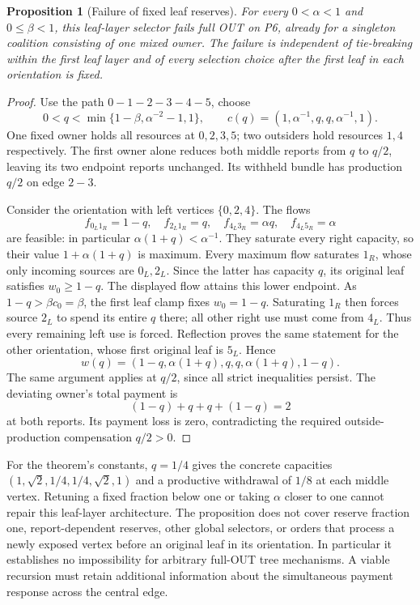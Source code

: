 \documentclass[11pt]{article}
\newtheorem{proposition}[theorem]{Proposition}
\theoremstyle{definition}\newtheorem{definition}[theorem]{Definition}
\theoremstyle{remark}\newtheorem{remark}[theorem]{Remark}
\begin{document}
\begin{proposition}[Failure of fixed leaf reserves]\label{graph:recursion-failure}
For every $0<\alpha<1$ and $0\le\beta<1$, this leaf-layer selector fails
full OUT on P6, already for a singleton coalition consisting of one mixed owner.
The failure is independent of tie-breaking within the first leaf layer and
of every selection choice after the first leaf in each orientation is fixed.
\end{proposition}
\begin{proof}
Use the path $0-1-2-3-4-5$, choose
\[
 0<q<\min\{1-\beta,\alpha^{-2}-1,1\},
 \qquad c(q)=(1,\alpha^{-1},q,q,\alpha^{-1},1).
\]
One fixed owner holds all resources at $0,2,3,5$; two outsiders hold resources
$1,4$ respectively. The first owner alone reduces both middle reports from
$q$ to $q/2$, leaving its two endpoint reports unchanged. Its withheld bundle
has production $q/2$ on edge $2-3$.

Consider the orientation with left vertices $\{0,2,4\}$. The flows
\[
 f_{0_L1_R}=1-q,\quad f_{2_L1_R}=q,\quad
 f_{4_L3_R}=\alpha q,\quad f_{4_L5_R}=\alpha
\]
are feasible: in particular $\alpha(1+q)<\alpha^{-1}$.
They saturate every right capacity, so their value $1+\alpha(1+q)$ is
maximum. Every maximum flow saturates $1_R$, whose only incoming sources
are $0_L,2_L$. Since the latter has capacity $q$, its original leaf satisfies
$w_0\ge1-q$. The displayed flow attains this lower endpoint. As
$1-q>\beta c_0=\beta$, the first leaf clamp fixes $w_0=1-q$.
Saturating $1_R$ then forces source $2_L$ to spend its entire $q$ there;
all other right use must come from $4_L$. Thus every remaining left use
is forced. Reflection proves the same statement for the other orientation,
whose first original leaf is $5_L$. Hence
\[
 w(q)=(1-q,\alpha(1+q),q,q,\alpha(1+q),1-q).
\]
The same argument applies at $q/2$, since all strict inequalities persist.
The deviating owner's total payment is
\[
 (1-q)+q+q+(1-q)=2
\]
at both reports. Its payment loss is zero, contradicting the required
outside-production compensation $q/2>0$.
\end{proof}

For the theorem's constants, $q=1/4$ gives the concrete capacities
$(1,\sqrt2,1/4,1/4,\sqrt2,1)$ and a productive withdrawal of $1/8$
at each middle vertex. Retuning a fixed fraction below one or taking
$\alpha$ closer to one cannot repair this leaf-layer architecture. The
proposition does not cover reserve fraction one, report-dependent reserves,
other global selectors, or orders that process a newly exposed vertex before
an original leaf in its orientation. In particular it establishes no
impossibility for arbitrary full-OUT tree mechanisms. A viable recursion
must retain additional information about the simultaneous payment response
across the central edge.
\end{document}
